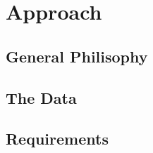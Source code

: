 \section{Approach}\label{sec:approach}
\subsection{General Philisophy}
\subsection{The Data}
\subsection{Requirements}